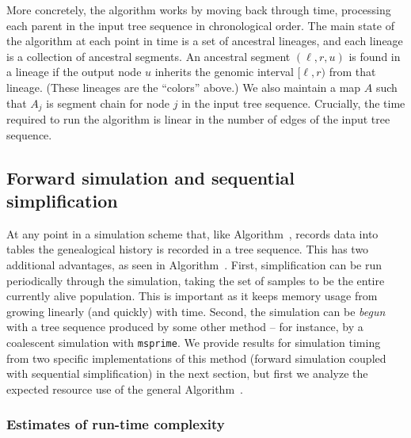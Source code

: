 \documentclass{article}
\newcommand{\msprime}{\texttt{msprime}}
\begin{document}
More concretely,
the algorithm works by moving back through time,
processing each parent in the input tree sequence in chronological order.
The main state of the algorithm at each point in time is a set of ancestral lineages,
and each lineage is a collection of ancestral segments.
An ancestral segment $(\ell, r, u)$ is found in a lineage
if the output node $u$ inherits the genomic interval $[\ell, r)$ from that lineage.
(These lineages are the ``colors'' above.)
We also maintain a map $A$ such that $A_j$ is segment chain for node $j$ in
the input tree sequence.
Crucially, the time required to run the algorithm is linear in the number of edges of the input tree sequence.

\subsection*{Forward simulation and sequential simplification}

At any point in a simulation scheme that, like Algorithm~, records
data into tables the genealogical history is recorded
in a tree sequence.
This has two additional advantages, as seen in Algorithm~.
First, simplification
can be run periodically through the simulation, taking the set of samples to be
the entire currently alive population. This is important as it keeps memory
usage from growing linearly (and quickly) with time. Second, the simulation can
be \emph{begun} with a tree sequence produced by some other method -- for
instance, by a coalescent simulation with \msprime.
We provide results for simulation timing from two specific implementations of this
method (forward simulation coupled with sequential simplification)
in the next section, but first we analyze the expected resource use of the
general Algorithm~.



\subsubsection*{Estimates of run-time complexity}
\end{document}
